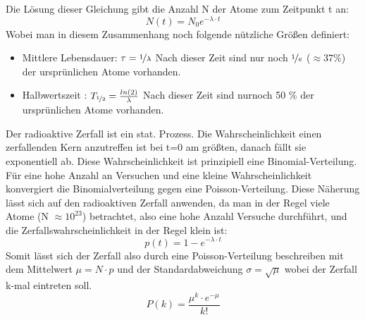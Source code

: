 \documentclass[Ex4_Zusammenfassung.tex]{subfiles}
\begin{document}
\begin{itemize}
Die Lösung dieser Gleichung gibt die Anzahl N der Atome zum Zeitpunkt t an: 
\begin{equation}
N(t) = N_{0} e^{-\lambda \cdot t}
\end{equation}  
Wobei man in diesem Zusammenhang noch folgende nützliche Größen definiert: 
\begin{itemize}
\item Mittlere Lebensdauer: $ \tau = \nicefrac{1}{\lambda} $ \newline 
Nach dieser Zeit sind nur noch $\nicefrac{1}{e} $ ($ \approx 37 \% $) der ursprünlichen Atome vorhanden.
\item Halbwertszeit : $ T_{\nicefrac{1}{2}} = \frac{ln(2)}{\lambda} $
Nach dieser Zeit sind nurnoch 50 \% der ursprünlichen Atome vorhanden.
\end{itemize}
\end{itemize}
Der radioaktive Zerfall ist ein stat. Prozess. Die Wahrscheinlichkeit einen zerfallenden Kern anzutreffen ist bei t=0 am größten, danach fällt sie exponentiell ab. 
Diese Wahrscheinlichkeit ist prinzipiell eine Binomial-Verteilung. Für eine hohe Anzahl an Versuchen und eine kleine Wahrscheinlichkeit konvergiert die Binomialverteilung gegen eine Poisson-Verteilung. Diese Näherung lässt sich auf den radioaktiven Zerfall anwenden, da man in der Regel viele Atome (N $\approx 10^{23} $) betrachtet, also eine hohe Anzahl Versuche durchführt, und die Zerfallswahrscheinlichkeit in der Regel klein ist: 
\begin{equation}
p(t) = 1 - e^{-\lambda \cdot t} 
\end{equation}
Somit lässt sich der Zerfall also durch eine Poisson-Verteilung beschreiben mit dem Mittelwert $ \mu = N\cdot p $ und der Standardabweichung  $ \sigma = \sqrt{\mu} $ wobei der Zerfall k-mal eintreten soll. 
\begin{equation}
P(k) = \frac{\mu^k \cdot e^{-\mu} } {k!} 
\end{equation}
\end{document}
